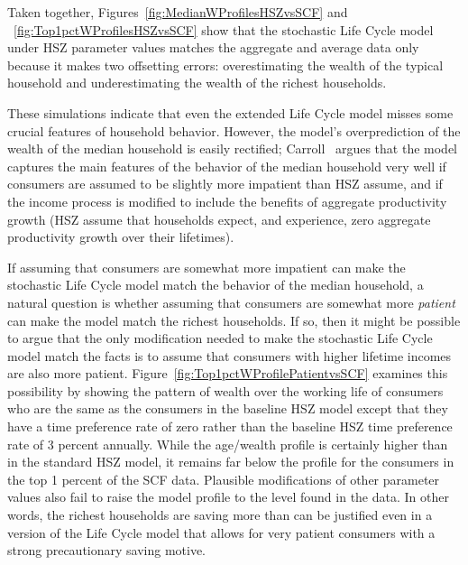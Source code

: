 \documentclass[titlepage,12pt]{article}
\begin{document}
Taken together, Figures~\ref{fig:MedianWProfilesHSZvsSCF} and 
~\ref{fig:Top1pctWProfilesHSZvsSCF} show that the stochastic Life 
Cycle model under HSZ parameter values matches the aggregate and 
average data only because it makes two offsetting errors: 
overestimating the wealth of the typical household and underestimating 
the wealth of the richest households.

These simulations indicate that even the extended Life Cycle model 
misses some crucial features of household behavior.  However, the 
model's overprediction of the wealth of the median household is easily 
rectified; Carroll~\cite{carroll:brookings,carrollBSLCPIH} argues 
that the model captures the main features of the behavior of the 
median household very well if consumers are assumed to be slightly more 
impatient than HSZ assume, and if the income process is modified to 
include the benefits of aggregate productivity growth (HSZ assume that 
households expect, and experience, zero aggregate productivity growth 
over their lifetimes).  

If assuming that consumers are somewhat more impatient can make the 
stochastic Life Cycle model match the behavior of the median 
household, a natural question is whether assuming that consumers are 
somewhat more {\it patient} can make the model match the richest 
households.  If so, then it might be possible to argue that the only 
modification needed to make the stochastic Life Cycle model match the 
facts is to assume that consumers with higher lifetime incomes are 
also more patient.  Figure~\ref{fig:Top1pctWProfilePatientvsSCF} 
examines this possibility by showing the pattern of wealth over the 
working life of consumers who are the same as the consumers in the 
baseline HSZ model except that they have a time preference rate of 
zero rather than the baseline HSZ time preference rate of 3 percent 
annually.  While the age/wealth profile is certainly higher than in 
the standard HSZ model, it remains far below the profile for 
the consumers in the top 1 percent of the SCF data.  Plausible 
modifications of other parameter values also fail to raise the model 
profile to the level found in the data.  In other words, the richest 
households are saving more than can be justified even in a version of 
the Life Cycle model that allows for very patient consumers with a 
strong precautionary saving motive.
\end{document}
